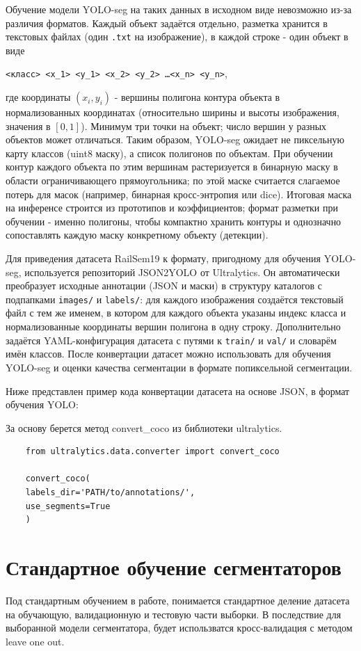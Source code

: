 \documentclass[areasetadvanced]{scrartcl}
\begin{document}
Обучение модели YOLO-seg на таких данных в исходном виде невозможно из-за различия форматов. Каждый объект задаётся отдельно, разметка хранится в текстовых файлах (один \texttt{.txt} на изображение), в каждой строке - один объект в виде
\begin{center}
\texttt{<класс> <x\_1> <y\_1> <x\_2> <y\_2> \ldots <x\_n> <y\_n>},
\end{center}
где координаты $(x_i, y_i)$ - вершины полигона контура объекта в нормализованных координатах (относительно ширины и высоты изображения, значения в $[0, 1]$). Минимум три точки на объект; число вершин у разных объектов может отличаться. Таким образом, YOLO-seg ожидает не пиксельную карту классов (uint8 маску), а список полигонов по объектам. При обучении контур каждого объекта по этим вершинам растеризуется в бинарную маску в области ограничивающего прямоугольника; по этой маске считается слагаемое потерь для масок (например, бинарная кросс-энтропия или dice). Итоговая маска на инференсе строится из прототипов и коэффициентов; формат разметки при обучении - именно полигоны, чтобы компактно хранить контуры и однозначно сопоставлять каждую маску конкретному объекту (детекции).

Для приведения датасета RailSem19 к формату, пригодному для обучения YOLO-seg, используется репозиторий JSON2YOLO от Ultralytics. Он автоматически преобразует исходные аннотации (JSON и маски) в структуру каталогов с подпапками \texttt{images/} и \texttt{labels/}: для каждого изображения создаётся текстовый файл с тем же именем, в котором для каждого объекта указаны индекс класса и нормализованные координаты вершин полигона в одну строку. Дополнительно задаётся YAML-конфигурация датасета с путями к \texttt{train/} и \texttt{val/} и словарём имён классов. После конвертации датасет можно использовать для обучения YOLO-seg и оценки качества сегментации в формате попиксельной сегментации.

Ниже представлен пример кода конвертации датасета на основе JSON, в формат обучения YOLO:

За основу берется метод convert\_coco из библиотеки ultralytics.

\begin{lstlisting}
    from ultralytics.data.converter import convert_coco

    convert_coco(
    labels_dir='PATH/to/annotations/',  
    use_segments=True                   
    )
\end{lstlisting}

\newpage
\section{Стандартное обучение сегментаторов}
Под стандартным обучением в работе, понимается стандартное деление датасета на обучающую, валидационную и тестовую части выборки. В последствие для выборанной модели сегментатора, будет использватся кросс-валидация с методом leave one  out. 
\end{document}
